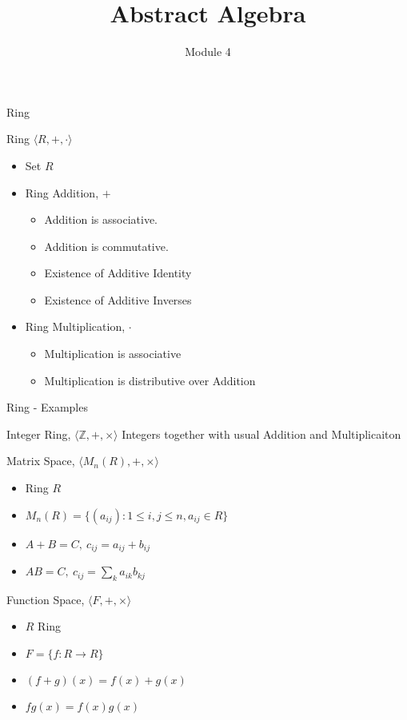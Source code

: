 \documentclass{beamer}
\title{Abstract Algebra}
\author{Module 4}
\institute{Section 26 : Homomorphisms \& Factor Rings}
\begin{document}
\begin{frame}
	\maketitle
\end{frame}

\begin{frame}{Ring}
\begin{block}{Ring $\langle R,+,\cdot \rangle$}
\begin{itemize}
	\item Set $R$
	\item Ring Addition, $+$
	\begin{itemize}
		\item Addition is associative.
		\item Addition is commutative.
		\item Existence of Additive Identity
		\item Existence of Additive Inverses
	\end{itemize}
	\item Ring Multiplication, $\cdot$
	\begin{itemize}
		\item Multiplication is associative
		\item Multiplication is distributive over Addition
	\end{itemize}
\end{itemize}
\end{block}
\end{frame}

\begin{frame}{Ring - Examples}
\begin{exampleblock}{Integer Ring, $\langle \mathbb{Z},+,\times \rangle$}
	Integers together with usual Addition and Multiplicaiton
\end{exampleblock}
\begin{exampleblock}{Matrix Space, $\langle M_n(R),+,\times \rangle$}
\begin{itemize}
	\item Ring $R$
	\item $M_n(R) = \{ (a_{ij}) : 1 \le i,j \le n, a_{ij} \in R\}$
	\item $A+B=C,\ c_{ij} = a_{ij}+b_{ij}$
	\item $AB = C,\ c_{ij} = \sum_k a_{ik}b_{kj}$
\end{itemize}
\end{exampleblock}
\begin{exampleblock}{Function Space, $\langle F,+,\times \rangle$}
\begin{itemize}
	\item $R$ Ring
	\item $F = \{ f : R \to R \}$
	\item $(f+g)(x) = f(x) + g(x)$
	\item $fg(x) = f(x)g(x)$
\end{itemize}
\end{exampleblock}
\end{frame}
\end{document}
